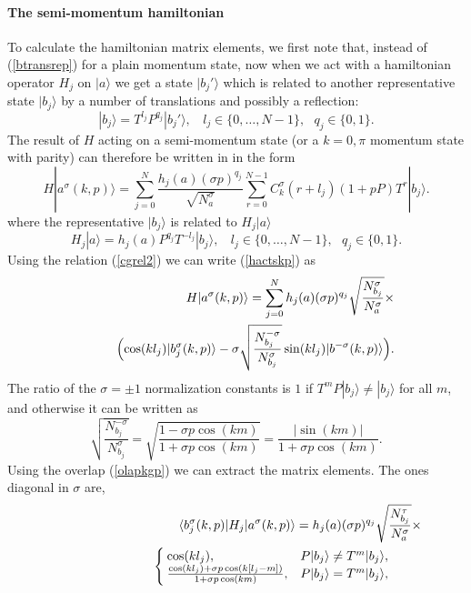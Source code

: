\documentclass[draft,numberedheadings]{aipproc}
\begin{document}
\paragraph{The semi-momentum hamiltonian}

To calculate the hamiltonian matrix elements, we first note that, instead of (\ref{btransrep}) for a plain momentum state, now when we act with a 
hamiltonian operator $H_j$ on $|a\rangle$ we get a state $|b_j'\rangle$ which is related to another representative state $|b_j\rangle$ by a number 
of translations and possibly a reflection:
\begin{equation}
|b_j\rangle =  T^{l_j}P^{q_j}|b_j'\rangle,~~~~ l_j \in \{0,\ldots,N-1\},~~~ q_j \in \{0,1\}.
\end{equation}
The result of $H$ acting on a semi-momentum state (or a $k=0,\pi$ momentum state with parity) can therefore be written in in the form
\begin{equation}
H|a^\sigma(k,p)\rangle = \sum_{j=0}^N \frac{h_j(a) (\sigma p)^{q_j}}{\sqrt{N^\sigma_a}}
\sum_{r=0}^{N-1}C^\sigma_k(r+l_j)(1 + pP)T^r|b_j\rangle .
\label{hactskp}
\end{equation}
where the representative $|b_j\rangle$ is related to $H_j|a\rangle$ 
\begin{equation}
H_j|a\rangle = h_j(a) P^{q_j} T^{-l_j}|b_j\rangle,~~~~ l_j \in \{0,\ldots,N-1\},~~~ q_j \in \{0,1\}.
\end{equation}
Using the relation (\ref{cgrel2}) we can write (\ref{hactskp}) as
\begin{eqnarray}
&&H|a^\sigma(k,p)\rangle = \sum_{j=0}^N h_j(a) (\sigma p)^{q_j}\sqrt{\frac{N^\sigma_{b_j}}{N^\sigma_a}} \times \\
&&~~~~~~\Bigl ( \cos(kl_j)|b_j^\sigma(k,p)\rangle  - \sigma \sqrt{\frac{N^{-\sigma}_{b_j}}{N^\sigma_{b_j}}}\sin(kl_j)|b^{-\sigma}(k,p)\rangle \Bigr ). \nonumber 
\end{eqnarray}
The ratio of the $\sigma= \pm 1$ normalization constants is $1$ if $T^mP|b_j\rangle \not= |b_j\rangle$ for all $m$, and otherwise it
can be written as
\begin{equation}
\sqrt{\frac{N^{-\sigma}_{b_j}}{N^\sigma_{b_j}}} = \sqrt{\frac{1-\sigma p \cos(km)}{1+\sigma p \cos(km)}} = 
\frac{|\sin(km)|}{1+\sigma p \cos(km)}. 
\end{equation}
Using the overlap (\ref{olapkgp}) we can extract the matrix elements. The ones diagonal in $\sigma$ are,
\begin{eqnarray}
&&\langle b_j^{\sigma}(k,p)|H_j|a^\sigma(k,p)\rangle = h_j(a) (\sigma p)^{q_j}\sqrt{\frac{N^\tau_{b_j}}{N^\sigma_a}} \times \nonumber \\
&& \hskip25mm\left\lbrace \begin{array}{ll}
\hskip-1.0mm \cos(kl_j), & P|b_j\rangle \not= T^m|b_j\rangle, \\
\hskip-1.0mm \frac{\cos(kl_j)+\sigma p\cos(k[l_j-m])}{1 +\sigma p\cos(km)}, & P|b_j\rangle = T^m|b_j\rangle,~~~~~~ 
\end{array}\right.  \label{hamkgp1}
\end{eqnarray}
\end{document}
